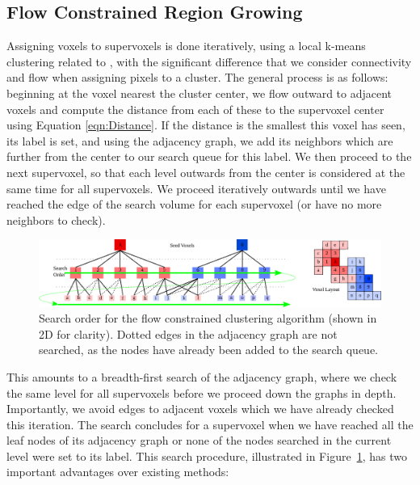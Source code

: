 \subsection{Flow Constrained Region Growing}
\label{subsec:FlowClustering}
Assigning voxels to supervoxels is done iteratively, using a local k-means clustering related to \cite{SLICCompared,DASP}, with the significant difference that we consider connectivity and flow when assigning pixels to a cluster. The general process is as follows: beginning at the voxel nearest the cluster center, we flow outward to adjacent voxels and compute the distance from each of these to the supervoxel center using Equation \ref{eqn:Distance}. If the distance is the smallest this voxel has seen, its label is set, and using the adjacency graph, we add its neighbors which are further from the center to our search queue for this label. We then proceed to the next supervoxel, so that each level outwards from the center is considered at the same time for all supervoxels. We proceed iteratively outwards until we have reached the edge of the search volume for each supervoxel (or have no more neighbors to check).

\begin{figure}
\begin{center}
   \includegraphics[width=0.95\linewidth]{figures/CVPR2013/SearchOrder.pdf}
\end{center}
   \caption[Voxel Search Order]{Search order for the flow constrained clustering algorithm (shown in 2D for clarity). Dotted edges in the adjacency graph are not searched, as the nodes have already been added to the search queue.}
\label{fig:ClusterSearch}
\end{figure}

This amounts to a breadth-first search of the adjacency graph, where we check the same level for all supervoxels before we proceed down the graphs in depth. Importantly, we avoid edges to adjacent voxels which we have already checked this iteration. The search concludes for a supervoxel when we have reached all the leaf nodes of its adjacency graph or none of the nodes searched in the current level were set to its label. This search procedure, illustrated in Figure~\ref{fig:ClusterSearch}, has two important advantages over existing methods:

